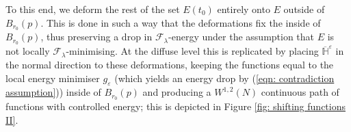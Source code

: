\documentclass[11pt]{article}
\begin{document}
\bigskip

To this end, we deform the rest of the set $E(t_0)$ entirely onto $E$ outside of $B_{r_0}(p)$. This is done in such a way that the deformations fix the inside of $B_{r_0}(p)$, thus preserving a drop in $\mathcal{F}_\lambda$-energy under the assumption that $E$ is not locally $\mathcal{F}_\lambda$-minimising. At the diffuse level this is replicated by placing $\overline{\mathbb{H}}^\varepsilon$ in the normal direction to these deformations, keeping the functions equal to the local energy minimiser $g_\varepsilon$ (which yields an energy drop by (\ref{eqn: contradiction assumption})) inside of $B_{r_0}(p)$ and producing a $W^{1,2}(N)$ continuous path of functions with controlled energy; this is depicted in Figure \ref{fig: shifting functions II}.

\bigskip
\begin{figure}[H]
\centering
\captionsetup{justification=justified,margin=1cm}
\begin{tikzpicture}[x=0.75pt,y=0.75pt,yscale=-1,xscale=1]


\end{tikzpicture}
\end{figure}
\end{document}
